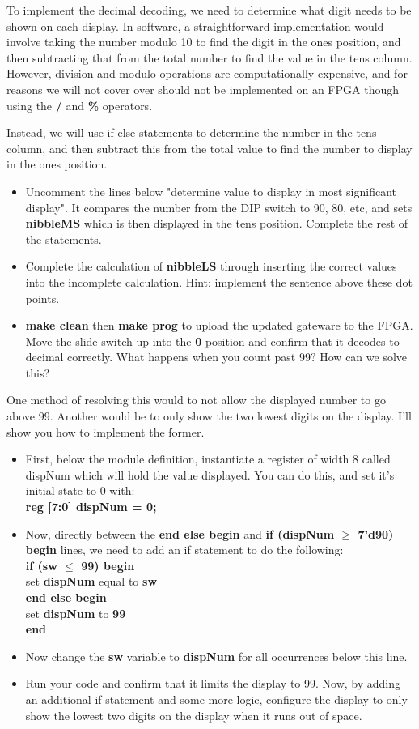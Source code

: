 \documentclass[12pt,a4paper]{article}
\begin{document}
	To implement the decimal decoding, we need to determine what digit needs to be shown on each display. In software, a straightforward implementation would involve taking the number modulo 10 to find the digit in the ones position, and then subtracting that from the total number to find the value in the tens column.  However, division and modulo operations are computationally expensive, and for reasons we will not cover over should not be implemented on an FPGA though using the \textbf{/} and \textbf{\%} operators.
	
	Instead, we will use if else statements to determine the number in the tens column, and then subtract this from the total value to find the number to display in the ones position.  
	
	\begin{itemize}
		\item Uncomment the lines below "determine value to display in most significant display". It compares the number from the DIP switch to 90, 80, etc, and sets \textbf{nibbleMS} which is then displayed in the tens position. Complete the rest of the statements. 
		\item Complete the calculation of \textbf{nibbleLS} through inserting the correct values into the incomplete calculation. Hint: implement the sentence above these dot points.
		\item \textbf{make clean} then \textbf{make prog} to upload the updated gateware to the FPGA. Move the slide switch up into the \textbf{0} position and confirm that it decodes to decimal correctly. What happens when you count past 99? How can we solve this?
	\end{itemize}
	One method of resolving this would to not allow the displayed number to go above 99. Another would be to only show the two lowest digits on the display. I'll show you how to implement the former.
	\begin{itemize}
		\item First, below the module definition, instantiate a register of width 8 called dispNum which will hold the value displayed. You can do this, and set it's initial state to 0 with: \\ \textbf{reg [7:0] dispNum = 0;}
		\item Now, directly between the \textbf{end else begin} and \textbf{if (dispNum $\ge$ 7'd90) begin} lines, we need to add an if statement to do the following: \\ 
		\textbf{if (sw $\le$ 99) begin}\\
		set \textbf{dispNum} equal to \textbf{sw}\\
		\textbf{end else begin}\\
		set \textbf{dispNum} to \textbf{99}\\
		\textbf{end}
		\item Now change the \textbf{sw} variable to \textbf{dispNum} for all occurrences below this line.
		\item Run your code and confirm that it limits the display to 99. Now, by adding an additional if statement and some more logic, configure the display to only show the lowest two digits on the display when it runs out of space.
	\end{itemize}
\end{document}
